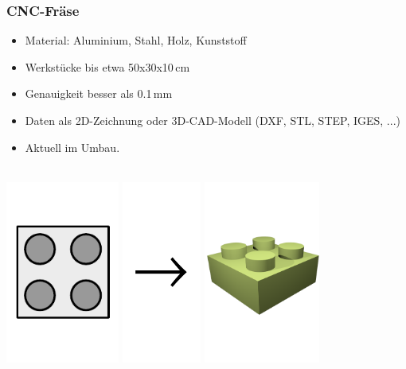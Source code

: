 \documentclass[t]{beamer}
\begin{document}
\begin{frame}
	\frametitle{CNC-Fräse}
	\begin{itemize}
		\item Material: Aluminium, Stahl, Holz, Kunststoff
		\item Werkstücke bis etwa 50x30x10\,cm
		\item Genauigkeit besser als 0.1\,mm
		\item Daten als 2D-Zeichnung oder 3D-CAD-Modell (DXF, STL, STEP, IGES, ...)
        \item Aktuell im Umbau.
	\end{itemize}
	\begin{center}
	~\\
	\includegraphics[height=6cm]{../img/legozeichnung.pdf}
	\includegraphics[height=6cm]{../img/pfeil.pdf}
	\includegraphics[height=6cm]{../img/fraese-lego-3d.png}

\end{center}
\end{frame}
\end{document}
